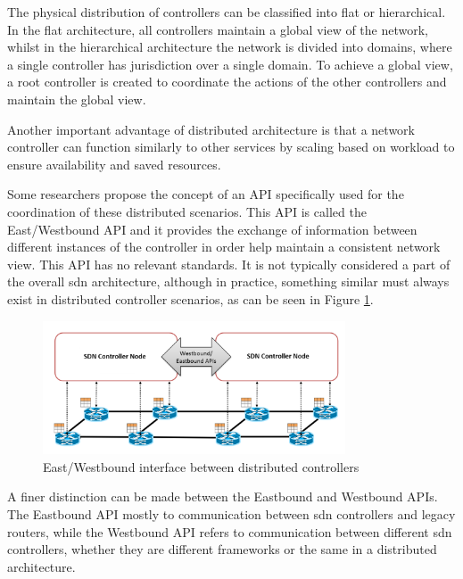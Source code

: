 The physical distribution of controllers can be classified into flat or hierarchical\cite{zhu_sdn_2020}. In the flat architecture, all controllers maintain a global view of the network, whilst in the hierarchical architecture the network is divided into domains, where a single controller has jurisdiction over a single domain. To achieve a global view, a root controller is created to coordinate the actions of the other controllers and maintain the global view. 

Another important advantage of distributed architecture is that a network controller can function similarly to other services by scaling based on workload to ensure availability and saved resources\cite{peterson_software-defined_2021}. 

Some researchers propose the concept of an API specifically used for the coordination of these distributed scenarios\cite{kreutz_software-defined_2015}\cite{xia_survey_2015}\cite{thyagaturu_software_2016}\cite{latif_comprehensive_2020}\cite{zhu_sdn_2020}. This API is called the East/Westbound API and it provides the exchange of information between different instances of the controller in order help maintain a consistent network view. This API has no relevant standards. It is not typically considered a part of the overall \gls{sdn} architecture, although in practice, something similar must always exist in distributed controller scenarios, as can be seen in Figure \ref{fig:east_west}.

\begin{figure}
	\centering
	\includegraphics[width=0.8\textwidth]{Chapters/Figures/SDNs/east_west_api.png}
	\caption{East/Westbound interface between distributed controllers\cite{kreutz_software-defined_2015}}
	\label{fig:east_west}
\end{figure}


A finer distinction can be made between the Eastbound and Westbound APIs\cite{kreutz_software-defined_2015}. The Eastbound API mostly to communication between \gls{sdn} controllers and legacy routers, while the Westbound API refers to communication between different \gls{sdn} controllers, whether they are different frameworks or the same in a distributed architecture. 


